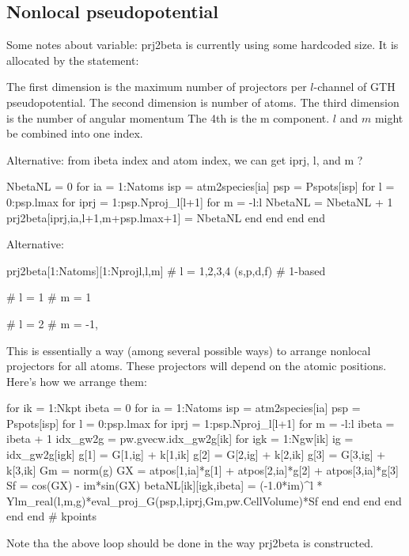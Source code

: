 \subsection{Nonlocal pseudopotential}



Some notes about  variable: prj2beta is currently
using some hardcoded size. It is allocated by the statement:
\begin{juliacode}
prj2beta = Array{Int64}(undef,3,Natoms,4,7)}
\end{juliacode}
The first dimension is the maximum number of projectors per $l$-channel
of GTH pseudopotential.
The second dimension is number of atoms.
The third dimension is the number of angular momentum
The 4th is the m component.
$l$ and $m$ might be combined into one index.

Alternative: from ibeta index and atom index, we can
get iprj, l, and m ?

\begin{juliacode}
NbetaNL = 0
for ia = 1:Natoms
  isp = atm2species[ia]
  psp = Pspots[isp]
  for l = 0:psp.lmax
    for iprj = 1:psp.Nproj_l[l+1]
      for m = -l:l
          NbetaNL = NbetaNL + 1
          prj2beta[iprj,ia,l+1,m+psp.lmax+1] = NbetaNL
      end
    end
  end
end
\end{juliacode}

Alternative:
\begin{juliacode}
prj2beta[1:Natoms][1:Nprojl,l,m]
# l = 1,2,3,4 (s,p,d,f) # 1-based

# l = 1
# m = 1

# l = 2
# m = -1,
\end{juliacode}

This is essentially a way (among several possible ways) to arrange nonlocal
projectors for all atoms.
These projectors will depend on the atomic positions.
Here's how we arrange them:
\begin{juliacode}
for ik = 1:Nkpt
    ibeta = 0
    for ia = 1:Natoms
        isp = atm2species[ia]
        psp = Pspots[isp]
        for l = 0:psp.lmax
        for iprj = 1:psp.Nproj_l[l+1]
        for m = -l:l
            ibeta = ibeta + 1
            idx_gw2g = pw.gvecw.idx_gw2g[ik]
            for igk = 1:Ngw[ik]
                ig = idx_gw2g[igk]
                g[1] = G[1,ig] + k[1,ik]
                g[2] = G[2,ig] + k[2,ik]
                g[3] = G[3,ig] + k[3,ik]
                Gm = norm(g)
                GX = atpos[1,ia]*g[1] + atpos[2,ia]*g[2] + atpos[3,ia]*g[3]
                Sf = cos(GX) - im*sin(GX)
                betaNL[ik][igk,ibeta] =
                (-1.0*im)^l * Ylm_real(l,m,g)*eval_proj_G(psp,l,iprj,Gm,pw.CellVolume)*Sf
            end
        end
        end
        end
    end
end  # kpoints
\end{juliacode}
Note tha the above loop should be done in the way prj2beta is constructed.

